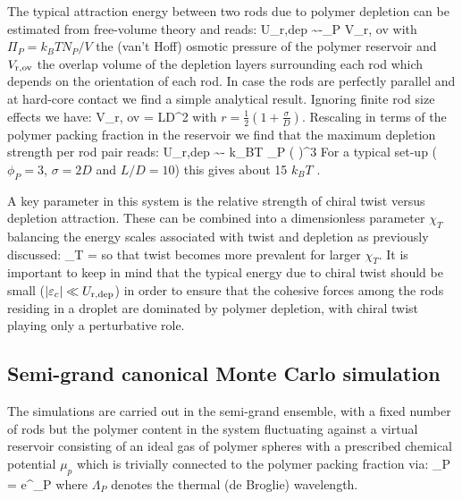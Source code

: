  The typical attraction energy between two rods due to polymer depletion can be estimated from free-volume theory \cite{lekkerkerker2011depletion} and reads:
 \beq
 U_{\rm r,dep} \sim -\Pi_{P} V_{\rm r, ov}
 \eeq
with $ \Pi_{P} = k_{B} T N_{P}/V$ the (van't Hoff) osmotic pressure of the polymer reservoir and $V_{\rm r, ov}$ the overlap volume  of the depletion layers surrounding each rod which depends on the orientation of each rod. In case the rods are perfectly parallel and at hard-core contact we find a simple analytical result. Ignoring  finite rod size effects we have:
\beq
V_{\rm r, ov} = LD^{2} 
\eeq
with $r = \tfrac{1}{2}(1 + \tfrac{\sigma}{D})$. Rescaling in terms of the polymer packing fraction in the reservoir we find that the maximum depletion strength per rod pair  reads:
\beq
  U_{\rm r,dep} \sim - k_{B}T \phi_{P}   \left (  \right )^{3} 
 \eeq
For a typical set-up ($\phi_{P} =3$, $\sigma = 2D$ and $L/D=10$) this gives about 15 $k_{B}T$ .

A key parameter in this system is the relative strength of chiral twist versus depletion attraction. These can be combined into a dimensionless parameter $\chi_{T}$ balancing the energy scales associated with twist and depletion as previously discussed:
\beq
\chi_{T} =  
\eeq
so that twist becomes more prevalent for larger $\chi_{T}$. It is important to keep in mind that the typical energy due to chiral twist should be small ($ | \varepsilon_{c} | \ll U_{\rm r,dep} $) in order to ensure that the cohesive forces among the rods residing in a droplet are dominated by polymer depletion, with chiral twist playing only a perturbative role.

\subsection{Semi-grand canonical Monte Carlo simulation}

The simulations are carried out in the semi-grand ensemble, with a fixed number of rods but the polymer content in the system fluctuating against a virtual reservoir consisting of an ideal gas of polymer spheres with a prescribed chemical potential  $\mu_{p}$ which is trivially connected to the polymer packing fraction via:
\beq
\phi_{P} =  e^{\beta \mu_{P}}
\eeq
where $\Lambda_{P}$ denotes the thermal (de Broglie) wavelength.

